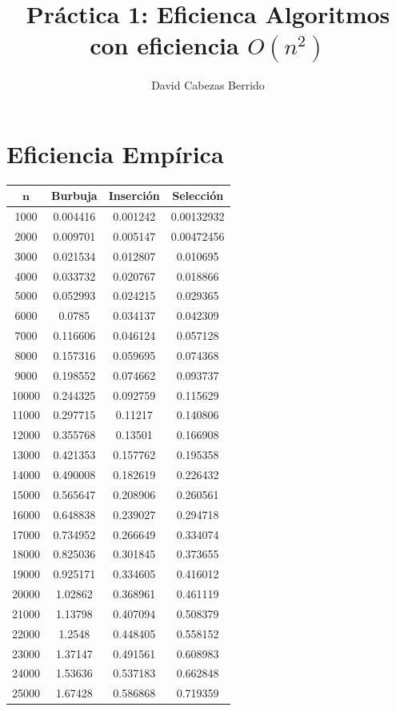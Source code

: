 \documentclass[a4]{article}
\author{David Cabezas Berrido}
\date{\vspace{-5mm}}
\title{\huge Práctica 1: Eficienca \HRule\vspace{-4mm}}
\begin{document}
\maketitle

\tableofcontents

\section{Eficiencia Empírica}

\begin{table}[H]
\begin{minipage}{0.45\linewidth}
\centering
\title{\large Algoritmos con eficiencia $O(n^2)$\vspace{4mm}}
\begin{tabular}{| c c c c |}
\hline
$\textbf{n}$ & \textbf{Burbuja} & \textbf{Inserción} & \textbf{Selección} \\ \hline
  1000  & 0.004416 & 0.001242 & 0.00132932 \\ 
  2000  & 0.009701 & 0.005147 & 0.00472456 \\ 
  3000  & 0.021534 & 0.012807 & 0.010695   \\ 
  4000  & 0.033732 & 0.020767 & 0.018866   \\ 
  5000  & 0.052993 & 0.024215 & 0.029365   \\ 
  6000  & 0.0785   & 0.034137 & 0.042309   \\ 
  7000  & 0.116606 & 0.046124 & 0.057128   \\ 
  8000  & 0.157316 & 0.059695 & 0.074368   \\ 
  9000  & 0.198552 & 0.074662 & 0.093737   \\ 
  10000 & 0.244325 & 0.092759 & 0.115629   \\ 
  11000 & 0.297715 & 0.11217  & 0.140806   \\ 
  12000 & 0.355768 & 0.13501  & 0.166908   \\ 
  13000 & 0.421353 & 0.157762 & 0.195358   \\
  14000 & 0.490008 & 0.182619 & 0.226432   \\
  15000 & 0.565647 & 0.208906 & 0.260561   \\
  16000 & 0.648838 & 0.239027 & 0.294718   \\
  17000 & 0.734952 & 0.266649 & 0.334074   \\
  18000 & 0.825036 & 0.301845 & 0.373655   \\
  19000 & 0.925171 & 0.334605 & 0.416012   \\
  20000 & 1.02862  & 0.368961 & 0.461119   \\
  21000 & 1.13798  & 0.407094 & 0.508379   \\
  22000 & 1.2548   & 0.448405 & 0.558152   \\
  23000 & 1.37147  & 0.491561 & 0.608983   \\
  24000 & 1.53636  & 0.537183 & 0.662848   \\
  25000 & 1.67428  & 0.586868 & 0.719359   \\ \hline
\end{tabular}
\end{minipage}


\end{table}
\end{document}
